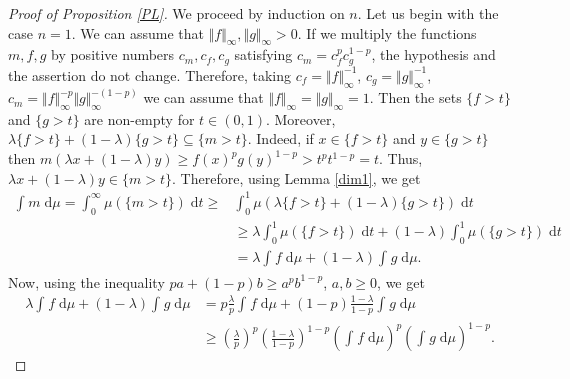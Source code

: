 \documentclass[11pt]{article}
\newcommand{\call}[4]{\int_{#1}^{#2} {#3} \; \textrm{d} {#4}}
\newcommand{\1}{\mathbf{{1}}}
\newcommand{\norma}[2]{\Vert #1 \Vert_{#2}}
\theoremstyle{definition}
\begin{document}
\begin{proof}[Proof of Proposition \ref{PL}]
We proceed by induction on $n$. Let us begin with the case $n=1$. We can assume that $\norma{f}{\infty},\norma{g}{\infty}>0$. If we multiply the functions $m,f,g$ by positive numbers $c_m, c_f, c_g$ satisfying $c_m=c_f^p c_g^{1-p}$, the hypothesis and the assertion do not change. Therefore, taking $c_f= \norma{f}{\infty}^{-1}$, $c_g= \norma{g}{\infty}^{-1}$, $c_m= \norma{f}{\infty}^{-p} \norma{g}{\infty}^{-(1-p)}$ we can assume that $\norma{f}{\infty}=\norma{g}{\infty}=1$. Then the sets $\{f > t\}$ and $\{g > t\}$ are non-empty for $t \in (0,1)$. Moreover, $\lambda\{f> t\}+(1-\lambda)\{g > t\} \subseteq \{m > t\}$. Indeed, if $x \in \{f > t\}$ and $y \in \{g > t\}$ then $m(\lambda x+(1-\lambda)y) \geq f(x)^pg(y)^{1-p} > t^pt^{1-p}=t$. Thus, $\lambda x+(1-\lambda)y \in \{m > t\}$. Therefore, using Lemma \ref{dim1}, we get
\begin{align*}
 \call{}{}{m}{\mu} = \call{0}{\infty}{\mu(\{m>t\})}{t} \geq & \call{0}{1}{\mu(\lambda\{f > t\}+(1-\lambda)\{g > t\})}{t} \\ & \geq \lambda \call{0}{1}{\mu(\{f > t\})}{t} + (1-\lambda) \call{0}{1}{\mu(\{g > t\})}{t} \\
  & = \lambda \call{}{}{f}{\mu} + (1-\lambda) \call{}{}{g}{\mu}. \end{align*}
Now, using the inequality $pa+(1-p)b \geq a^pb^{1-p}$, $a,b \geq 0$, we get
\begin{align}\label{p=l}
\lambda \call{}{}{f}{\mu} + (1-\lambda) \call{}{}{g}{\mu}
   & = p\frac{\lambda}{p} \call{}{}{f}{\mu} + (1-p)\frac{1-\lambda}{1-p} \call{}{}{g}{\mu} \\
   & \geq  \left( \frac{\lambda}{p} \right)^{p}  \left( \frac{1-\lambda}{1-p} \right)^{1-p} \left( \call{}{}{f}{\mu} \right)^p \left( \call{}{}{g}{\mu} \right)^{1-p}.
\end{align}


\end{proof}
\end{document}
